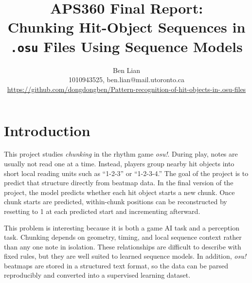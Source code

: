 \documentclass[final]{article}
\title{APS360 Final Report:\\Chunking Hit-Object Sequences in \texttt{.osu} Files Using Sequence Models}
\author{%
  Ben Lian \\
  1010943525, ben.lian@mail.utoronto.ca\\
  \url{https://github.com/dongdongben/Pattern-recognition-of-hit-objects-in-.osu-files}
}
\begin{document}
\maketitle

\vspace{-0.5in}

\section*{Introduction}
This project studies \emph{chunking} in the rhythm game \textit{osu!}. During play, notes are usually not read one at a time. Instead, players group nearby hit objects into short local reading units such as ``1-2-3'' or ``1-2-3-4.'' The goal of the project is to predict that structure directly from beatmap data. In the final version of the project, the model predicts whether each hit object starts a new chunk. Once chunk starts are predicted, within-chunk positions can be reconstructed by resetting to 1 at each predicted start and incrementing afterward.

This problem is interesting because it is both a game AI task and a perception task. Chunking depends on geometry, timing, and local sequence context rather than any one note in isolation. These relationships are difficult to describe with fixed rules, but they are well suited to learned sequence models. In addition, \textit{osu!} beatmaps are stored in a structured text format, so the data can be parsed reproducibly and converted into a supervised learning dataset.
\end{document}
